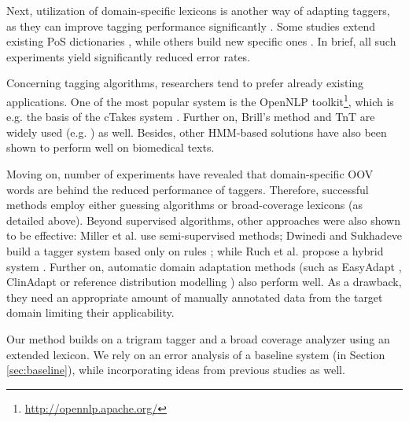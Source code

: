 Next, utilization of domain-specific lexicons is another way of adapting taggers, as they can improve tagging performance significantly \cite{coden2005domain,ruch2000minimal}. 
Some studies extend existing PoS dictionaries \cite{divita2006dtagger}, while others build new specific ones \cite{Smith2006}. 
In brief, all such experiments yield significantly reduced error rates. 

Concerning tagging algorithms, researchers tend to prefer already existing applications. 
One of the most popular system is the OpenNLP toolkit\footnote{\url{http://opennlp.apache.org/}}, which is e.g. the basis of the cTakes system \cite{Savova2010}.
Further on, Brill’s method \cite{Brill1992} and TnT \cite{Brants2000} are widely used (e.g. \cite{hahn2004tagging,Savova2010,pestian2004development}) as well. 
Besides, other HMM-based solutions have also been shown to perform well \cite{barrett2011token,coden2005domain,divita2006dtagger,hahn2004tagging,pakhomov2006developing,rost2008lessons,ruch2000minimal} on biomedical texts. 

Moving on, number of experiments have revealed \cite{ferraro2013improving,ruch2000minimal,Smith2006} that domain-specific OOV words are behind the reduced performance of taggers. 
Therefore, successful methods employ either guessing algorithms \cite{barrett2011token,divita2006dtagger,rost2008lessons,ruch2000minimal,Smith2006} or broad-coverage lexicons (as detailed above). 
Beyond supervised algorithms, other approaches were also shown to be effective: Miller et al. \cite{miller2007building} use semi-supervised methods;
Dwinedi and Sukhadeve build a tagger system based only on rules \cite{dwivedi8rule}; while Ruch et al. propose a hybrid system \cite{ruch2000minimal}. 
Further on, automatic domain adaptation methods (such as EasyAdapt \cite{daume2007frustratingly}, ClinAdapt \cite{ferraro2013improving} 
or reference distribution modelling  \cite{tateisi2006subdomain}) also perform well. As a drawback, they need an appropriate amount of manually annotated data from the target domain limiting their applicability. 

Our method builds on a trigram tagger and a broad coverage analyzer using an extended lexicon. 
We rely on an error analysis of a baseline system (in Section \ref{sec:baseline}), while  incorporating ideas from previous studies as well.

